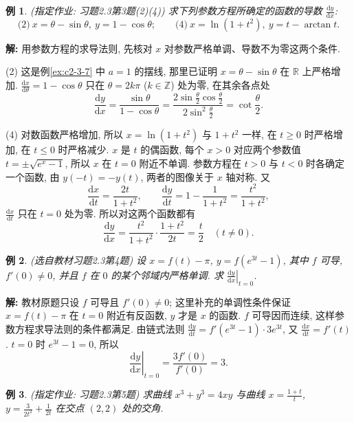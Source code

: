 \documentclass[UTF8,openany]{ctexbook}
\theoremstyle{chinesetextbook}
\newtheorem{example}{例}[section]
\newenvironment{cnsolution}{\par\indent\textbf{解:} \ignorespaces}{\par}
\newcommand{\dd}{\mathrm d}
\begin{document}
\begin{example}\label{ex:c2-h3-3}
\textnormal{(指定作业: 习题2.3第3题(2)(4))} 求下列参数方程所确定的函数的导数 $\displaystyle\frac{\dd y}{\dd x}$:
\[
\text{(2)}\ x=\theta-\sin\theta,\ y=1-\cos\theta;\qquad\text{(4)}\ x=\ln(1+t^2),\ y=t-\arctan t.
\]
\end{example}
\begin{cnsolution}
用参数方程的求导法则, 先核对 $x$ 对参数严格单调、导数不为零这两个条件.

(2) 这是例\ref{ex:c2-3-7} 中 $a=1$ 的摆线, 那里已证明 $x=\theta-\sin\theta$ 在 $\mathbb R$ 上严格增加. $\displaystyle\frac{\dd x}{\dd\theta}=1-\cos\theta$ 只在 $\theta=2k\pi$ ($k\in\mathbb Z$) 处为零, 在其余各点处
\[
\frac{\dd y}{\dd x}=\frac{\sin\theta}{1-\cos\theta}=\frac{2\sin\frac\theta2\cos\frac\theta2}{2\sin^2\frac\theta2}=\cot\frac\theta2.
\]

(4) 对数函数严格增加, 所以 $x=\ln(1+t^2)$ 与 $1+t^2$ 一样, 在 $t\ge0$ 时严格增加, 在 $t\le0$ 时严格减少. $x$ 是 $t$ 的偶函数, 每个 $x>0$ 对应两个参数值 $t=\pm\sqrt{e^x-1}$, 所以 $x$ 在 $t=0$ 附近不单调. 参数方程在 $t>0$ 与 $t<0$ 时各确定一个函数, 由 $y(-t)=-y(t)$, 两者的图像关于 $x$ 轴对称. 又
\[
\frac{\dd x}{\dd t}=\frac{2t}{1+t^2},\qquad\frac{\dd y}{\dd t}=1-\frac1{1+t^2}=\frac{t^2}{1+t^2},
\]
$\displaystyle\frac{\dd x}{\dd t}$ 只在 $t=0$ 处为零. 所以对这两个函数都有
\[
\frac{\dd y}{\dd x}=\frac{t^2}{1+t^2}\cdot\frac{1+t^2}{2t}=\frac t2\quad(t\ne0).
\]
\end{cnsolution}
\begin{example}\label{ex:c2-h3-4}
\textnormal{(选自教材习题2.3第4题)} 设 $x=f(t)-\pi$, $y=f\left(e^{3t}-1\right)$, 其中 $f$ 可导, $f'(0)\ne0$, 并且 $f$ 在 $0$ 的某个邻域内严格单调. 求 $\displaystyle\left.\frac{\dd y}{\dd x}\right|_{t=0}$.
\end{example}
\begin{cnsolution}
教材原题只设 $f$ 可导且 $f'(0)\ne0$; 这里补充的单调性条件保证 $x=f(t)-\pi$ 在 $t=0$ 附近有反函数, $y$ 才是 $x$ 的函数. $f$ 可导因而连续, 这样参数方程求导法则的条件都满足. 由链式法则 $\displaystyle\frac{\dd y}{\dd t}=f'\left(e^{3t}-1\right)\cdot3e^{3t}$, 又 $\displaystyle\frac{\dd x}{\dd t}=f'(t)$. $t=0$ 时 $e^{3t}-1=0$, 所以
\[
\left.\frac{\dd y}{\dd x}\right|_{t=0}=\frac{3f'(0)}{f'(0)}=3.
\]
\end{cnsolution}
\begin{example}\label{ex:c2-h3-5}
\textnormal{(指定作业: 习题2.3第5题)} 求曲线 $x^3+y^3=4xy$ 与曲线 $\displaystyle x=\frac{1+t}t$, $\displaystyle y=\frac3{2t^2}+\frac1{2t}$ 在交点 $(2,2)$ 处的交角.
\end{example}
\end{document}
